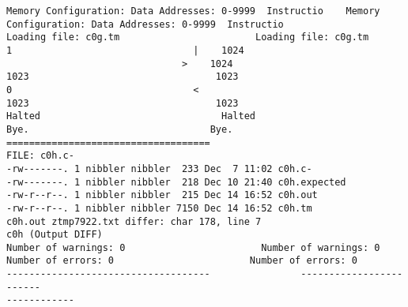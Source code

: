 \documentclass[12pt]{book}
\begin{document}
\begin{lstlisting}
Memory Configuration: Data Addresses: 0-9999  Instructio    Memory 
Configuration: Data Addresses: 0-9999  Instructio
Loading file: c0g.tm                        Loading file: c0g.tm
1                                |    1024 
                               >    1024 
1023                                 1023 
0                                <
1023                                 1023 
Halted                                Halted
Bye.                                Bye.
====================================
FILE: c0h.c-
-rw-------. 1 nibbler nibbler  233 Dec  7 11:02 c0h.c-
-rw-------. 1 nibbler nibbler  218 Dec 10 21:40 c0h.expected
-rw-r--r--. 1 nibbler nibbler  215 Dec 14 16:52 c0h.out
-rw-r--r--. 1 nibbler nibbler 7150 Dec 14 16:52 c0h.tm
c0h.out ztmp7922.txt differ: char 178, line 7
c0h (Output DIFF)
Number of warnings: 0                        Number of warnings: 0
Number of errors: 0                        Number of errors: 0
------------------------------------                ------------------------
------------


\end{lstlisting}
\end{document}
